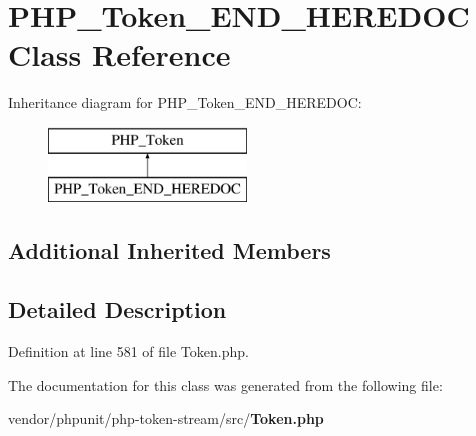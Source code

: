 \section{P\+H\+P\+\_\+\+Token\+\_\+\+E\+N\+D\+\_\+\+H\+E\+R\+E\+D\+O\+C Class Reference}
\label{class_p_h_p___token___e_n_d___h_e_r_e_d_o_c}
Inheritance diagram for P\+H\+P\+\_\+\+Token\+\_\+\+E\+N\+D\+\_\+\+H\+E\+R\+E\+D\+O\+C\+:\begin{figure}[H]
\begin{center}
\leavevmode
\includegraphics[height=2.000000cm]{class_p_h_p___token___e_n_d___h_e_r_e_d_o_c}
\end{center}
\end{figure}
\subsection*{Additional Inherited Members}


\subsection{Detailed Description}


Definition at line 581 of file Token.\+php.



The documentation for this class was generated from the following file\+:\begin{DoxyCompactItemize}
\item 
vendor/phpunit/php-\/token-\/stream/src/{\bf Token.\+php}\end{DoxyCompactItemize}
